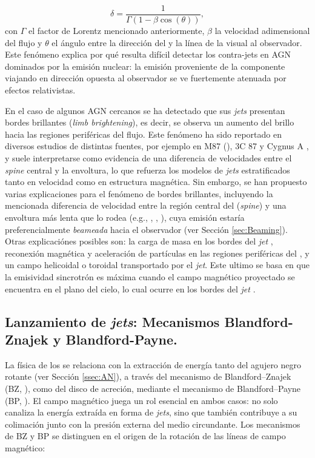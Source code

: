 	\begin{equation}\label{eq:Doppler}
	\delta=\frac{1}{\Gamma(1-\beta\cos(\theta))},
	\end{equation}
	con $\Gamma$ el factor de Lorentz mencionado anteriormente, $\beta$ la velocidad adimensional del flujo y $\theta$ el \'angulo entre la direcci\'on del \jet y la l\'inea de la visual al observador.
	Este fenómeno explica por qué resulta difícil detectar los contra-jets en AGN dominados por la emisión nuclear: la emisión proveniente de la componente viajando en dirección opuesta al observador se ve fuertemente atenuada por efectos relativistas.

	En el caso de algunos AGN cercanos se ha detectado que sus \textit{jets} presentan bordes brillantes (\textit{limb brightening}), es decir, se observa un aumento del brillo hacia las regiones periféricas del flujo.
	Este fenómeno ha sido reportado en diversos estudios de distintas fuentes, por ejemplo en M87 (\citealt{Mertens2016,Walker2016}), 3C 87 \citep{Nagai2019} y Cygnus A \citep{Boccardi2015}, y suele interpretarse como evidencia de una diferencia de velocidades entre el \textit{spine} central y la envoltura, lo que refuerza los modelos de \textit{jets} estratificados tanto en velocidad como en estructura magnética.
	Sin embargo, se han propuesto varias explicaciones para el fenómeno de bordes brillantes, incluyendo la mencionada diferencia de velocidad entre la región central del \jet (\textit{spine}) y una envoltura más lenta que lo rodea (e.g., \citealt{Mertens2016}, \citealt{Walker2016}, \citealt{Nagai2019}), cuya emisión estaría preferencialmente \textit{beameada} hacia el observador (ver Sección \ref{sec:Beaming}). Otras explicaci\'ones posibles son: la carga de masa en los bordes del \textit{jet} \citep[ver ][]{Bruni2021}, reconexión magnética y aceleración de partículas en las regiones periféricas del \jet \citep[e.g.][]{Yang2024}, y un campo helicoidal o toroidal transportado por el \textit{jet}. Este ultimo se basa en que la emisividad sincrotrón es máxima cuando el campo magnético proyectado se encuentra en el plano del cielo, lo cual ocurre en los bordes del \textit{jet} \citep[ver ][]{Nakamura2018}.


\subsection{Lanzamiento de \textit{jets}: Mecanismos Blandford-Znajek y Blandford-Payne.}

	La física de los \jets se relaciona con la extracción de energía tanto del agujero negro rotante (ver Sección \ref{ssec:AN}), a través del mecanismo de Blandford--Znajek (BZ, \citealt{Blandford1977}), como del disco de acreción, mediante el mecanismo de Blandford--Payne (BP, \citealt{Blandford1982}).
	El campo magn\'etico juega un rol esencial en ambos casos: no solo canaliza la energ\'ia extra\'ida en forma de \textit{jets}, sino que tambi\'en contribuye a su colimaci\'on junto con la presi\'on externa del medio circundante.
	Los mecanismos de BZ y BP se distinguen en el origen de la rotaci\'on de las l\'ineas de campo magn\'etico:

